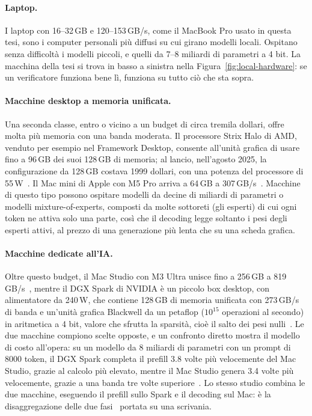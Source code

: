 \paragraph{Laptop.} I laptop con 16--32\,GB e 120--153\,GB/s, come il MacBook Pro usato in questa tesi, sono i computer
personali più diffusi su cui girano modelli locali. Ospitano senza difficoltà i modelli piccoli, e quelli da 7--8
miliardi di parametri a 4 bit. La macchina della tesi si trova in basso a sinistra nella Figura~\ref{fig:local-hardware}:
se un verificatore funziona bene lì, funziona su tutto ciò che sta sopra.

\paragraph{Macchine desktop a memoria unificata.} Una seconda classe, entro o vicino a un budget di circa tremila
dollari, offre molta più memoria con una banda moderata. Il processore Strix Halo di AMD, venduto per esempio nel
Framework Desktop, consente all'unità grafica di usare fino a 96\,GB dei suoi 128\,GB di memoria; al lancio, nell'agosto
2025, la configurazione da 128\,GB costava 1999 dollari, con una potenza del processore di 55\,W~\cite{hachman2025framework}.
Il Mac mini di Apple con M5 Pro arriva a 64\,GB a 307\,GB/s~\cite{apple2026macmini}. Macchine di questo tipo possono
ospitare modelli da decine di miliardi di parametri o modelli mixture-of-experts, composti da molte sottoreti (gli esperti) di cui ogni token ne attiva solo
una parte, così che il decoding legge soltanto i pesi degli esperti attivi, al prezzo di una generazione più lenta che su una scheda grafica.

\paragraph{Macchine dedicate all'IA.} Oltre questo budget, il Mac Studio con M3 Ultra unisce fino a 256\,GB a
819\,GB/s~\cite{apple2025macstudio}, mentre il DGX Spark di NVIDIA è un piccolo box desktop, con alimentatore da
240\,W, che contiene 128\,GB di memoria unificata con 273\,GB/s di banda e un'unità grafica Blackwell da un petaflop
($10^{15}$ operazioni al secondo) in aritmetica a 4 bit, valore che sfrutta la sparsità, cioè il salto dei pesi
nulli~\cite{nvidia2026dgxspark}. Le due macchine compiono scelte opposte, e un confronto diretto mostra il
modello di costo all'opera: su un modello da 8 miliardi di parametri con un prompt di 8000 token, il DGX Spark completa il
prefill 3.8 volte più velocemente del Mac Studio, grazie al calcolo più elevato, mentre il Mac Studio genera 3.4 volte più
velocemente, grazie a una banda tre volte superiore~\cite{exo2025spark}. Lo stesso studio combina le due macchine,
eseguendo il prefill sullo Spark e il decoding sul Mac: è la disaggregazione delle due fasi~\cite{patel2024splitwise}
portata su una scrivania.

